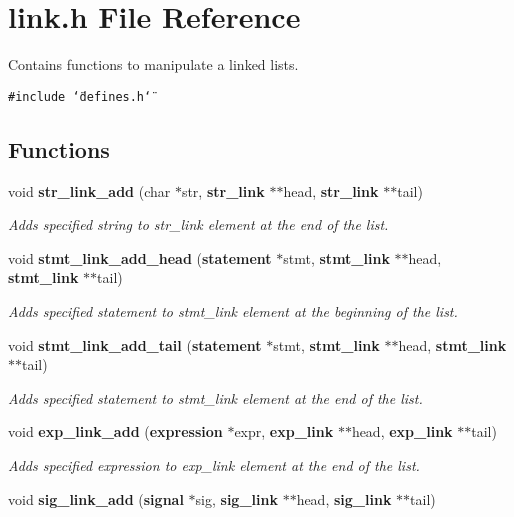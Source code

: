\section{link.h File Reference}
\label{link_8h}
Contains functions to manipulate a linked lists. 


{\tt \#include \char`\"{}defines.h\char`\"{}}\par
\subsection*{Functions}
\begin{CompactItemize}
\item 
void {\bf str\_\-link\_\-add} (char $\ast$str, {\bf str\_\-link} $\ast$$\ast$head, {\bf str\_\-link} $\ast$$\ast$tail)
\begin{CompactList}\small\item\em Adds specified string to str\_\-link element at the end of the list.\item\end{CompactList}\item 
void {\bf stmt\_\-link\_\-add\_\-head} ({\bf statement} $\ast$stmt, {\bf stmt\_\-link} $\ast$$\ast$head, {\bf stmt\_\-link} $\ast$$\ast$tail)
\begin{CompactList}\small\item\em Adds specified statement to stmt\_\-link element at the beginning of the list.\item\end{CompactList}\item 
void {\bf stmt\_\-link\_\-add\_\-tail} ({\bf statement} $\ast$stmt, {\bf stmt\_\-link} $\ast$$\ast$head, {\bf stmt\_\-link} $\ast$$\ast$tail)
\begin{CompactList}\small\item\em Adds specified statement to stmt\_\-link element at the end of the list.\item\end{CompactList}\item 
void {\bf exp\_\-link\_\-add} ({\bf expression} $\ast$expr, {\bf exp\_\-link} $\ast$$\ast$head, {\bf exp\_\-link} $\ast$$\ast$tail)
\begin{CompactList}\small\item\em Adds specified expression to exp\_\-link element at the end of the list.\item\end{CompactList}\item 
void {\bf sig\_\-link\_\-add} ({\bf signal} $\ast$sig, {\bf sig\_\-link} $\ast$$\ast$head, {\bf sig\_\-link} $\ast$$\ast$tail)

\end{CompactItemize}

